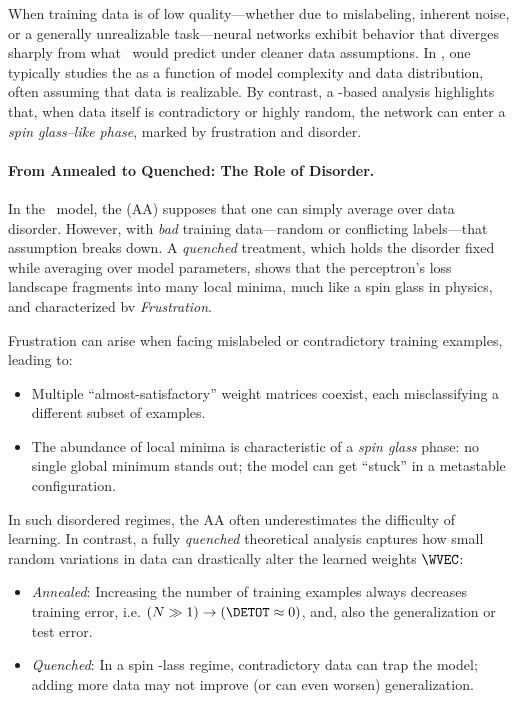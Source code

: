 \label{sxn:SMOG_main-spin_glass}

When training data is of low quality---whether due to mislabeling, inherent noise, or a generally unrealizable task---neural networks exhibit behavior that diverges sharply from what \SLT\ would predict under cleaner data assumptions. In \SLT, one typically studies the \GeneralizationError as a function of model complexity and data distribution, often assuming that data is realizable. By contrast, a \STATMECH-based analysis highlights that, when data itself is contradictory or highly random, the network can enter a \emph{spin glass--like phase}, marked by frustration and disorder.

\paragraph{From Annealed to Quenched: The Role of Disorder.}
In the \StudentTeacher\ model, the \AnnealedApproximation (AA) supposes that one can simply average over data disorder. However, with \emph{bad} training data---random or conflicting labels---that assumption breaks down. A \emph{quenched} treatment, which holds the disorder fixed while averaging over model parameters, shows that the perceptron's loss landscape fragments into many local minima, much like a spin glass in physics, and characterized bv \emph{Frustration}.

Frustration can arise when facing mislabeled or contradictory training examples, leading to:
\begin{itemize}
\item Multiple ``almost-satisfactory'' weight matrices coexist, each misclassifying a different subset of examples.
\item The abundance of local minima is characteristic of a \emph{spin glass} phase: no single global minimum stands out; the model can get ``stuck'' in a metastable configuration.
\end{itemize}

In such disordered regimes, the AA often underestimates the difficulty of learning.
In contrast, a fully \emph{quenched} theoretical analysis captures
how small random variations in data can drastically alter the learned weights $\WVEC$:
\begin{itemize}
\item \emph{Annealed}: Increasing the number of training examples always decreases training error, i.e. $(N \gg 1) \rightarrow (\DETOT\approx 0)$, and, also the generalization or test error.  
\item \emph{Quenched}: In a spin -lass regime, contradictory data can trap the model; adding more data may not improve (or can even worsen) generalization.
\end{itemize}

